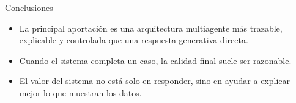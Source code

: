 \documentclass[aspectratio=169]{beamer}
\begin{document}
\begin{frame}{Conclusiones}
\begin{itemize}
  \item La principal aportación es una arquitectura multiagente más trazable, explicable y controlada que una respuesta generativa directa.
  \item Cuando el sistema completa un caso, la calidad final suele ser razonable.
  \item El valor del sistema no está solo en responder, sino en ayudar a explicar mejor lo que muestran los datos.
\end{itemize}
\end{frame}
\end{document}

